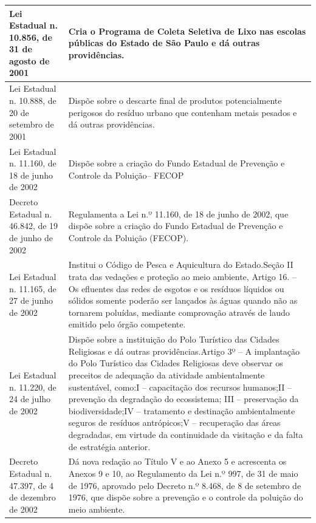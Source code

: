\begin{center}
\begin{longtable}{|p{}|p{}|}
			\hline
			Lei  Estadual  n.  10.856,  de  31 de agosto de 2001 & Cria o Programa de Coleta Seletiva de Lixo nas escolas públicas do Estado de São Paulo e dá outras providências. \\
			\hline
			Lei  Estadual  n.  10.888,  de  20 de setembro de 2001 & Dispõe sobre o descarte final de produtos potencialmente perigosos do resíduo urbano que contenham metais pesados e dá outras providências. \\
			\hline
			Lei  Estadual  n.  11.160,  de  18 de junho de 2002 & Dispõe sobre a criação do Fundo Estadual de Prevenção e Controle da Poluição\newline{}– FECOP \\
			\hline
			Decreto Estadual n. 46.842, de 19 de junho de 2002 & Regulamenta  a  Lei  n.º  11.160,  de  18  de  junho  de  2002,  que  dispõe  sobre  a criação do Fundo Estadual de Prevenção e Controle da Poluição (FECOP). \\
			\hline
			Lei  Estadual  n.  11.165,  de  27 de junho de 2002 & Institui o Código de Pesca e Aquicultura do Estado.\newline{}Seção  II  trata  das  vedações  e  proteção  ao  meio  ambiente,  Artigo  16.  –  Os efluentes  das  redes  de  esgotos  e  os  resíduos  líquidos  ou  sólidos  somente poderão  ser  lançados  às  águas  quando  não  as  tornarem  poluídas,  mediante comprovação através de laudo emitido pelo órgão competente. \\
			\hline
			Lei  Estadual  n.  11.220,  de  24 de julho de 2002 & Dispõe sobre a instituição do Polo Turístico das Cidades Religiosas e dá outras providências.\newline{}Artigo  3º  –  A  implantação  do  Polo  Turístico  das  Cidades  Religiosas  deve observar os preceitos de adequação da atividade ambientalmente sustentável, como:\newline{}I – capacitação dos recursos humanos;\newline{}II – prevenção da degradação do ecossistema; III – preservação da biodiversidade;\newline{}IV – tratamento e destinação ambientalmente seguros de resíduos antrópicos;\newline{}V – recuperação das áreas degradadas, em virtude da continuidade da visitação e da falta de estratégia anterior. \\
			\hline
			Decreto Estadual n. 47.397, de 4 de dezembro de 2002 & Dá nova redação ao Título V e ao Anexo 5 e acrescenta os Anexos 9 e 10, ao Regulamento da Lei n.º 997, de 31 de maio de 1976, aprovado pelo Decreto n.º 8.468, de 8 de setembro de 1976, que dispõe sobre a prevenção e o controle da poluição do meio ambiente. \\

\end{longtable}
\end{center}

